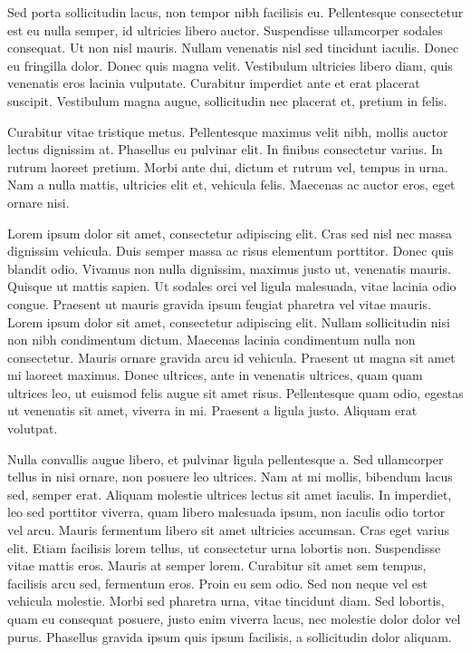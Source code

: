 \documentclass{article}
\begin{document}
 Sed porta sollicitudin lacus, non tempor nibh facilisis eu. Pellentesque consectetur est eu nulla semper, id ultricies libero auctor. Suspendisse ullamcorper sodales consequat. Ut non nisl mauris. Nullam venenatis nisl sed tincidunt iaculis. Donec eu fringilla dolor. Donec quis magna velit. Vestibulum ultricies libero diam, quis venenatis eros lacinia vulputate. Curabitur imperdiet ante et erat placerat suscipit. Vestibulum magna augue, sollicitudin nec placerat et, pretium in felis. 



 Curabitur vitae tristique metus. Pellentesque maximus velit nibh, mollis auctor lectus dignissim at. Phasellus eu pulvinar elit. In finibus consectetur varius. In rutrum laoreet pretium. Morbi ante dui, dictum et rutrum vel, tempus in urna. Nam a nulla mattis, ultricies elit et, vehicula felis. Maecenas ac auctor eros, eget ornare nisi. 



 Lorem ipsum dolor sit amet, consectetur adipiscing elit. Cras sed nisl nec massa dignissim vehicula. Duis semper massa ac risus elementum porttitor. Donec quis blandit odio. Vivamus non nulla dignissim, maximus justo ut, venenatis mauris. Quisque ut mattis sapien. Ut sodales orci vel ligula malesuada, vitae lacinia odio congue. Praesent ut mauris gravida ipsum feugiat pharetra vel vitae mauris. Lorem ipsum dolor sit amet, consectetur adipiscing elit. Nullam sollicitudin nisi non nibh condimentum dictum. Maecenas lacinia condimentum nulla non consectetur. Mauris ornare gravida arcu id vehicula. Praesent ut magna sit amet mi laoreet maximus. Donec ultrices, ante in venenatis ultrices, quam quam ultrices leo, ut euismod felis augue sit amet risus. Pellentesque quam odio, egestas ut venenatis sit amet, viverra in mi. Praesent a ligula justo. Aliquam erat volutpat. 



 Nulla convallis augue libero, et pulvinar ligula pellentesque a. Sed ullamcorper tellus in nisi ornare, non posuere leo ultrices. Nam at mi mollis, bibendum lacus sed, semper erat. Aliquam molestie ultrices lectus sit amet iaculis. In imperdiet, leo sed porttitor viverra, quam libero malesuada ipsum, non iaculis odio tortor vel arcu. Mauris fermentum libero sit amet ultricies accumsan. Cras eget varius elit. Etiam facilisis lorem tellus, ut consectetur urna lobortis non. Suspendisse vitae mattis eros. Mauris at semper lorem. Curabitur sit amet sem tempus, facilisis arcu sed, fermentum eros. Proin eu sem odio. Sed non neque vel est vehicula molestie. Morbi sed pharetra urna, vitae tincidunt diam. Sed lobortis, quam eu consequat posuere, justo enim viverra lacus, nec molestie dolor dolor vel purus. Phasellus gravida ipsum quis ipsum facilisis, a sollicitudin dolor aliquam. 
\end{document}
